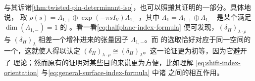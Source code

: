 \begin{remark}\label{thm:shift-alternative-proof}
与其诉诸\cref{thm:twisted-pin-determinant-iso}，也可以照搬其证明的一部分。具体地说，
取 $\rho(s)=\Lambda_{1,+}\oplus\exp(-\pi s I_V)\Lambda_{1,-}$，其中
$\Lambda_1=\Lambda_{1,+}\oplus\Lambda_{1,-}$ 是某个满足 $\dim(\Lambda_{1,-})=1$ 的%
\trSplitting。看一看\eqref{eq:halfplane-index-formula} 便可发现，$(\delta_H)_{\lambda\cdot\rho}$
与 $(\delta_H)_\lambda$ 相差一个增补进来的张量因子 $\Lambda_{1,-}$。而\trTwisted{}
\trPinStructure{}的选取恰好对应于同一空间的一个\trOrientation，这就使人得以认定
$(\delta_H)_{\lambda\cdot\rho}\cong(\delta_H)_\lambda$。这一论证更为初等，因为它避开了%
\trIndex{}理论；然而原有的证明对某些目的来说更为方便，比如理解
\eqref{eq:shift-index-orientation} 与\eqref{eq:general-surface-index-formula} 中诸%
\trIsomorphism{}之间的相互作用。
\end{remark}

